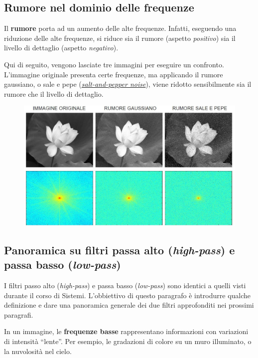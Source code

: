 \documentclass[a4paper]{article}
\newcommand{\dquotes}[1]{``#1''}
\begin{document}
	\subsection{Rumore nel dominio delle frequenze}
	
	Il \textcolor{Red3}{\textbf{rumore}} porta ad un aumento delle alte frequenze. Infatti, eseguendo una riduzione delle alte frequenze, si riduce sia il rumore (aspetto \emph{positivo}) sia il livello di dettaglio (aspetto \emph{negativo}).\newline
	
	\noindent
	Qui di seguito, vengono lasciate tre immagini per eseguire un confronto. L'immagine originale presenta certe frequenze, ma applicando il rumore gaussiano, o sale e pepe (\href{https://it.wikipedia.org/wiki/Rumore_sale_e_pepe}{\emph{salt-and-pepper noise}}), viene ridotto sensibilmente sia il rumore che il livello di dettaglio.
	\begin{figure}[!htp]
		\centering
		\includegraphics[width=\textwidth]{img/rumore_dominio_frequenze.jpg}
	\end{figure}\newpage

	\subsection{Panoramica su filtri passa alto (\emph{high-pass}) e passa basso (\emph{low-pass})}
	
	I filtri passo alto (\emph{high-pass}) e passa basso (\emph{low-pass}) sono identici a quelli visti durante il corso di Sistemi. L'obbiettivo di questo paragrafo è introdurre qualche definizione e dare una panoramica generale dei due filtri approfonditi nei prossimi paragrafi.\newline
	
	\noindent
	In un immagine, le \textbf{frequenze basse} rappresentano informazioni con variazioni di intensità \dquotes{lente}. Per esempio, le gradazioni di colore su un muro illuminato, o la nuvolosità nel cielo.\newline
	
\end{document}
